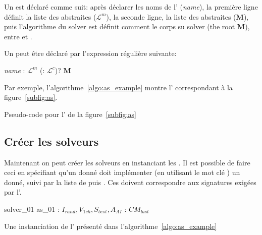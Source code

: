 Un \as{} est déclaré comme suit: après déclarer les noms de l'\mbox{\tet{\bf \as}} ({\it name}), la première ligne définit la liste des \oms{} abstraites ($\mathcal{L}^m$), la seconde ligne, la liste des \opchs{} abstraites ($\mathbf{M}$), puis l'algorithme du solver est définit comment le corps su solver (the root \cm{} $\mathbf{M}$), entre \mbox{} et \mbox{}.

Un \as{} peut être déclaré par l'expression régulière suivante:

\begin{center}
 {\it name} : $\mathcal{L}^m$ (: $\mathcal{L}^c$)?  $\mathbf{M}$ 
\end{center}

Par exemple, l'algorithme~\ref{algo:as_example} montre l'\as{} correspondant à la figure~\ref{subfig:as}.

\begin{algorithm}[h]
\dontprintsemicolon
\scriptsize
\SetInd{2pt}{3pt}
\SetNoline
{}
\caption{Pseudo-code \posl{} pour l'\as{} de la figure~\ref{subfig:as}}\label{algo:as_example}
\end{algorithm}

\subsection{Créer les solveurs}

Maintenant on peut créer les solveurs en instanciant les \ms. Il est possible de faire ceci en spécifiant qu'un \mbox{} donné doit implémenter (en utilisant le mot clé \mbox{}) un \as{} donné, suivi par la liste de \omprefix{} puis \opchs{}. Ces \ms{} doivent correspondre aux signatures exigées par l'\as.

\begin{algorithm}[h]
\dontprintsemicolon
\scriptsize
\SetNoline
{}
 solver\_01  as\_01\;
 : $I_{rand}, V_{1ch}, S_{best}, A_{AI}$ \; 
: $CM_{last}$\;
\caption{Une instanciation de l'\as{} présenté dans l'algorithme~\ref{algo:as_example}}\label{algo:solver_def}
\end{algorithm}

